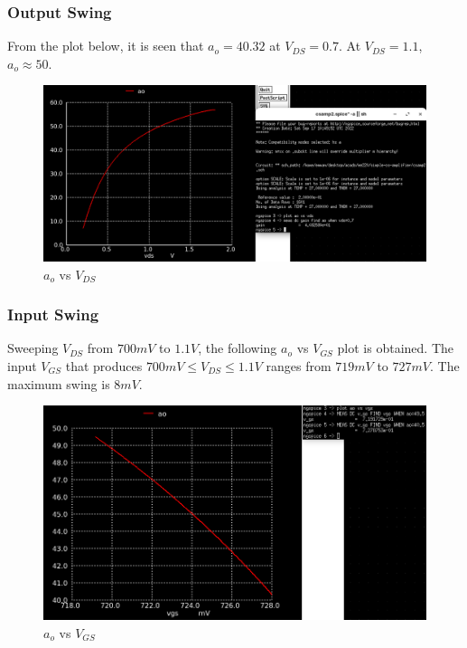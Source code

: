 \documentclass[conference]{IEEEtran}
\begin{document}
\subsubsection{Output Swing}
From the plot below, it is seen that $a_o=40.32$ at $V_{DS}=0.7$. At $V_{DS}=1.1$, $a_o\approx 50$.
\begin{figure}[H]
	\centering 
	\includegraphics[width=\columnwidth]{gain-fumax-vds.png}
	\caption{$a_o$ vs $V_{DS}$}
	\label{ao-fumax-vds}	
\end{figure}
\subsubsection{Input Swing}
Sweeping $V_{DS}$ from $700mV$ to $1.1V$, the following $a_o$ vs $V_{GS}$ plot is obtained. 
The input $V_{GS}$ that produces $700mV \leq V_{DS} \leq 1.1V$ ranges from $719mV$ to $727mV$. 
The maximum swing is $8mV$. 
\begin{figure}[H]
	\centering 
	\includegraphics[width=\columnwidth]{gain-fumax-vgs.png}
	\caption{$a_o$ vs $V_{GS}$}
	\label{ao-fumax-vgs}	
\end{figure}
\end{document}
